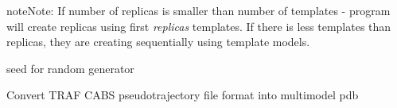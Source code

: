 \documentclass[letterpaper,10pt,english]{sphinxmanual}
\begin{document}
\begin{fulllineitems}
\begin{fulllineitems}
\begin{quote}
\begin{description}
\begin{itemize}
\end{itemize}

\end{description}\end{quote}

\begin{notice}{note}{Note:}
If number of replicas is smaller than number of templates - program will create replicas using first \emph{replicas} templates. If there is less templates than replicas, they are creating sequentially using template models.
\end{notice}

\end{fulllineitems}


\begin{fulllineitems}
\label{index:pycabs.CABS.rng_seed}
seed for random generator

\end{fulllineitems}


\begin{fulllineitems}
\label{index:pycabs.CABS.trafToPdb}
Convert TRAF CABS pseudotrajectory file format into multimodel pdb

\end{fulllineitems}


\end{fulllineitems}

\end{document}

